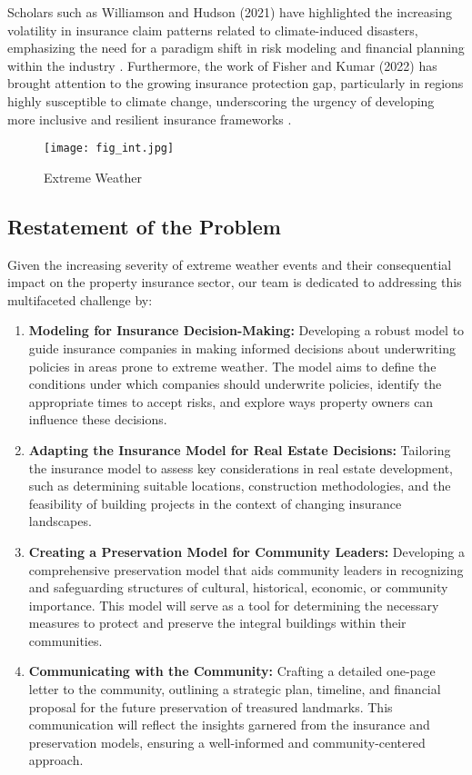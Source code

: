 \documentclass{mcmthesis}
\begin{document}
Scholars such as Williamson and Hudson (2021) have highlighted the increasing volatility in insurance claim patterns related to climate-induced disasters, emphasizing the need for a paradigm shift in risk modeling and financial planning within the industry \cite{1}. Furthermore, the work of Fisher and Kumar (2022) has brought attention to the growing insurance protection gap, particularly in regions highly susceptible to climate change, underscoring the urgency of developing more inclusive and resilient insurance frameworks \cite{2}.


\begin{figure}[h] 
    \centering
    \texttt{[image: fig\_int.jpg]}
    \caption{Extreme Weather} \label{fig_int}
\end{figure}

\subsection{Restatement of the Problem}

Given the increasing severity of extreme weather events and their consequential impact on the property insurance sector, our team is dedicated to addressing this multifaceted challenge by:

\begin{enumerate}
    \item \textbf{Modeling for Insurance Decision-Making:} Developing a robust model to guide insurance companies in making informed decisions about underwriting policies in areas prone to extreme weather. The model aims to define the conditions under which companies should underwrite policies, identify the appropriate times to accept risks, and explore ways property owners can influence these decisions.
    
    \item \textbf{Adapting the Insurance Model for Real Estate Decisions:} Tailoring the insurance model to assess key considerations in real estate development, such as determining suitable locations, construction methodologies, and the feasibility of building projects in the context of changing insurance landscapes.
    
    \item \textbf{Creating a Preservation Model for Community Leaders:} Developing a comprehensive preservation model that aids community leaders in recognizing and safeguarding structures of cultural, historical, economic, or community importance. This model will serve as a tool for determining the necessary measures to protect and preserve the integral buildings within their communities.
    
    \item \textbf{Communicating with the Community:} Crafting a detailed one-page letter to the community, outlining a strategic plan, timeline, and financial proposal for the future preservation of treasured landmarks. This communication will reflect the insights garnered from the insurance and preservation models, ensuring a well-informed and community-centered approach.
\end{enumerate}
\end{document}
